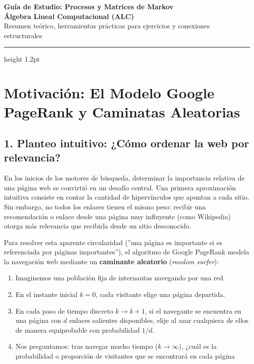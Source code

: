 \documentclass[11pt,a4paper]{article}
\theoremstyle{definition}
\begin{document}
\begin{center}
    {\LARGE \textbf{\color{primaryblue} Guía de Estudio: Procesos y Matrices de Markov}}\\[4pt]
    {\large \textbf{Álgebra Lineal Computacional (ALC)}} \\[2pt]
    \small Resumen teórico, herramientas prácticas para ejercicios y conexiones estructurales
\end{center}
\vspace{-0.5em}
\hrule height 1.2pt
\vspace{1em}

\section*{Motivación: El Modelo Google PageRank y Caminatas Aleatorias}

\subsection*{1. Planteo intuitivo: ¿Cómo ordenar la web por relevancia?}
En los inicios de los motores de búsqueda, determinar la importancia relativa
de una página web se convirtió en un desafío central. Una primera
aproximación intuitiva consiste en contar la cantidad de hipervínculos que
apuntan a cada sitio. Sin embargo, no todos los enlaces tienen el
mismo peso: recibir una recomendación o enlace desde una página muy influyente
(como Wikipedia) otorga más relevancia que recibirla desde un sitio
desconocido.

Para resolver esta aparente circularidad (''una página es importante si es
referenciada por páginas importantes''), el algoritmo de Google PageRank modela
la navegación web mediante un \textbf{caminante aleatorio} (\textit{random
    surfer}):
\begin{enumerate}
    \item Imaginemos una población fija de internautas navegando por una red.
    \item En el instante inicial $k = 0$, cada visitante elige una página departida.
    \item En cada paso de tiempo discreto $k \to k+1$, si el navegante se encuentra en una página con $d$ enlaces salientes disponibles, elije al azar cualquiera de ellos de manera equiprobable con probabilidad $1/d$.
    \item Nos preguntamos: tras navegar mucho tiempo ($k \to \infty$), ¿cuál es la probabilidad o proporción de visitantes que se encontrará en cada página
\end{enumerate}
\end{document}
